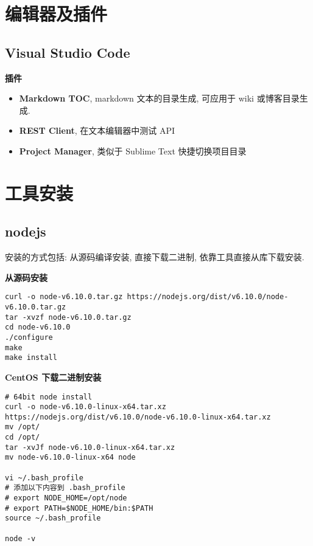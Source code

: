 \section{编辑器及插件}\label{ux7f16ux8f91ux5668ux53caux63d2ux4ef6}

\subsection{Visual Studio Code}\label{visual-studio-code}

\textbf{插件}

\begin{itemize}
\tightlist
\item
  \textbf{Markdown TOC}, markdown 文本的目录生成, 可应用于 wiki
  或博客目录生成.
\item
  \textbf{REST Client}, 在文本编辑器中测试 API
\item
  \textbf{Project Manager}, 类似于 Sublime Text 快捷切换项目目录
\end{itemize}

\section{工具安装}\label{ux5de5ux5177ux5b89ux88c5}

\subsection{nodejs}\label{nodejs}

安装的方式包括: 从源码编译安装, 直接下载二进制,
依靠工具直接从库下载安装.

\textbf{从源码安装}

\begin{lstlisting}
curl -o node-v6.10.0.tar.gz https://nodejs.org/dist/v6.10.0/node-v6.10.0.tar.gz
tar -xvzf node-v6.10.0.tar.gz
cd node-v6.10.0
./configure
make
make install
\end{lstlisting}

\textbf{CentOS 下载二进制安装}

\begin{lstlisting}
# 64bit node install
curl -o node-v6.10.0-linux-x64.tar.xz https://nodejs.org/dist/v6.10.0/node-v6.10.0-linux-x64.tar.xz
mv /opt/
cd /opt/
tar -xvJf node-v6.10.0-linux-x64.tar.xz
mv node-v6.10.0-linux-x64 node

vi ~/.bash_profile
# 添加以下内容到 .bash_profile
# export NODE_HOME=/opt/node
# export PATH=$NODE_HOME/bin:$PATH
source ~/.bash_profile

node -v
\end{lstlisting}

